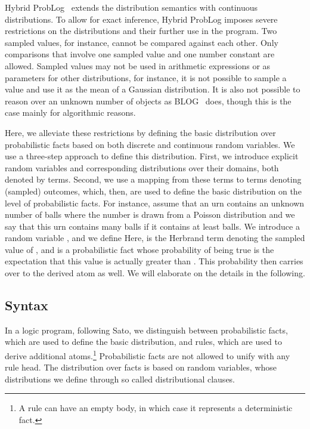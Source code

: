 \documentclass{tlp}
\begin{document}
Hybrid ProbLog~\cite{gutmann10ilp} extends the distribution semantics
with continuous distributions.  To allow for exact inference, Hybrid
ProbLog imposes severe restrictions on the distributions and their
further use in the program.  Two sampled values, for instance, cannot
be compared against each other. Only comparisons that involve one
sampled value and one number constant are allowed. Sampled values may
not be used in arithmetic expressions or as parameters for other
distributions, for instance, it is not possible to sample a value and
use it as the mean of a Gaussian distribution. It is also not possible
to reason over an unknown number of objects as BLOG~\cite{Milch05}
does, though this is the case mainly for algorithmic reasons.

Here, we alleviate these restrictions by defining the basic
distribution  over probabilistic facts based on both discrete and
continuous random variables.  We use a three-step approach to define
this distribution. First, we introduce explicit random variables and
corresponding distributions over their domains, both denoted by
terms. Second, we use a mapping from these terms to terms denoting
(sampled) outcomes, which, then, are used to define the basic
distribution  on the level of probabilistic facts. For instance,
assume that an urn contains an unknown number of balls where the
number is drawn from a Poisson distribution and we say
that this urn contains many balls if it contains at least 
balls. We introduce a random variable , and we define
 Here,
 is the Herbrand term denoting the sampled
value of , and 
is a probabilistic fact whose probability of being true is the
expectation that this value is actually greater than . This
probability then carries over to the derived atom  as
well.  We will elaborate on the details in the following.

\subsection{Syntax}
\label{sec:syntax}

In a logic program, following Sato, we distinguish between
probabilistic facts, which are used to define the basic distribution,
and rules, which are used to derive additional atoms.\footnote{A rule
  can have an empty body, in which case it represents a deterministic
  fact.} Probabilistic facts are not allowed to unify with any rule
head.  The distribution over facts is based on random variables, whose
distributions we define through so called distributional clauses.
\end{document}
